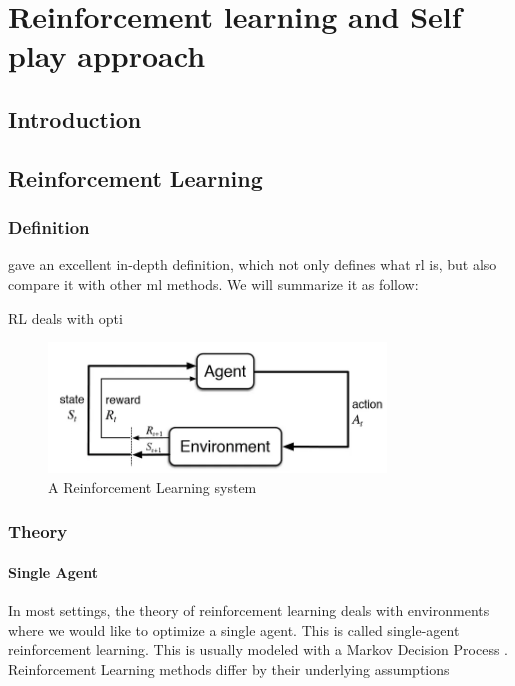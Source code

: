 \chapter{Reinforcement learning and Self play approach}
\section{Introduction}
\section{Reinforcement Learning}
\subsection{Definition}
\citeauthor{RLIntroduction} \cite[Chapter.~1]{RLIntroduction} gave an excellent in-depth definition, which not only defines what \acrfull{rl} is, but also compare it with other \acrfull{ml} methods.
\newline We will summarize it as follow:
\begin{definition}
	RL deals with opti
\end{definition}
\begin{figure}
	\centering
	\includegraphics[width= 0.8\textwidth]{Figures/RLDiagram.png}
	\caption{A Reinforcement Learning system}
\end{figure}
\subsection{Theory}
\subsubsection{Single Agent}
In most settings, the theory of reinforcement learning deals with environments where we would like to optimize a single agent. This is called single-agent reinforcement learning. This is usually modeled with a Markov Decision Process \cite[Chapter~3]{RLIntroduction}.
\newline Reinforcement Learning methods differ by their underlying assumptions

